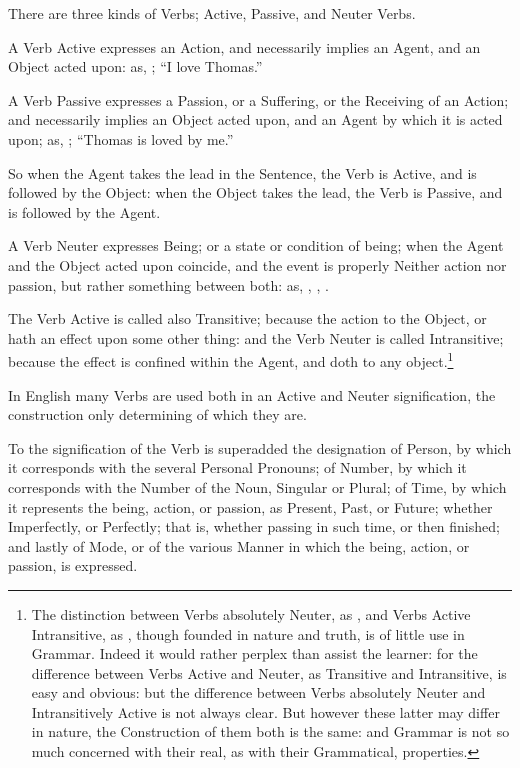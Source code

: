 There are three kinds of Verbs; Active, Passive, and Neuter Verbs.

A Verb Active expresses an Action, and necessarily implies an Agent, and
an Object acted upon: as, ; ``I love Thomas.''

A Verb Passive expresses a Passion, or a Suffering, or the Receiving of
an Action; and necessarily implies an Object acted upon, and an Agent by
which it is acted upon; as, ; ``Thomas is loved by me.''

So when the Agent takes the lead in the Sentence, the Verb is Active,
and is followed by the Object: when the Object takes the lead, the Verb
is Passive, and is followed by the Agent.

A Verb Neuter expresses Being; or a state or condition of being; when
the Agent and the Object acted upon coincide, and the event is properly
Neither action nor passion, but rather something between both: as, , , .

The Verb Active is called also Transitive; because the action
 to the Object, or hath an effect upon some other
thing: and the Verb Neuter is called Intransitive; because the effect is
confined within the Agent, and doth  to any
object.\footnote{The distinction between Verbs absolutely Neuter, as
  , and Verbs Active Intransitive, as , though
  founded in nature and truth, is of little use in Grammar. Indeed it
  would rather perplex than assist the learner: for the difference
  between Verbs Active and Neuter, as Transitive and Intransitive, is
  easy and obvious: but the difference between Verbs absolutely Neuter
  and Intransitively Active is not always clear. But however these
  latter may differ in nature, the Construction of them both is the
  same: and Grammar is not so much concerned with their real, as with
  their Grammatical, properties.}

In English many Verbs are used both in an Active and Neuter
signification, the construction only determining of which  they
are.

To the signification of the Verb is superadded the designation of
Person, by which it corresponds with the several Personal Pronouns; of
Number, by which it corresponds with the Number of the Noun, Singular or
Plural; of Time, by which it represents the being, action, or passion,
as Present, Past, or Future; whether Imperfectly, or Perfectly; that is,
whether passing in such time, or then finished; and lastly of Mode, or
of the various Manner in which the being, action, or passion, is
expressed.

